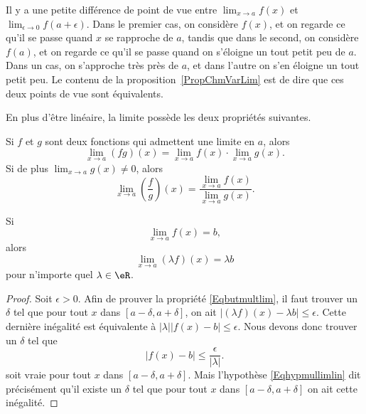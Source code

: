 Il y a une petite différence de point de vue entre \( \lim_{x\to a}f(x)\) et \( \lim_{\epsilon\to 0}f(a+\epsilon)\). Dans le premier cas, on considère \( f(x)\), et on regarde ce qu'il se passe quand \( x\) se rapproche de \( a\), tandis que dans le second, on considère \( f(a)\), et on regarde ce qu'il se passe quand on s'éloigne un tout petit peu de \( a\). Dans un cas, on s'approche très près de \( a\), et dans l'autre on s'en éloigne un tout petit peu. Le contenu de la proposition~\ref{PropChmVarLim} est de dire que ces deux points de vue sont équivalents.


En plus d'être linéaire, la limite possède les deux propriétés suivantes.
\begin{proposition}     \label{PROPooDQFIooMMwxxJ}
	Si \( f\) et \( g\) sont deux fonctions qui admettent une limite en \( a\), alors
	\begin{equation}
		\lim_{x\to a} (fg)(x)=\lim_{x\to a} f(x)\cdot\lim_{x\to a} g(x).
	\end{equation}
	Si de plus \( \lim_{x\to a} g(x)\neq 0\), alors
	\begin{equation}
		\lim_{x\to a} \left(\frac{ f }{ g }\right)(x)=\frac{ \lim_{x\to a} f(x) }{ \lim_{x\to a} g(x) }.
	\end{equation}
\end{proposition}

\begin{theorem}     \label{ThoLimLinMul}
	Si
	\begin{equation} \label{Eqhypmullimlin}
		\lim_{x\to a}f(x)=b,
	\end{equation}
	alors
	\begin{equation} \label{Eqbutmultlim}
		\lim_{x\to a}(\lambda f)(x)=\lambda b
	\end{equation}
	pour n'importe quel \( \lambda\in\eR\).
\end{theorem}

\begin{proof}
	Soit \( \epsilon>0\). Afin de prouver la propriété \eqref{Eqbutmultlim}, il faut trouver un \( \delta\) tel que pour tout \( x\) dans \( [a-\delta,a+\delta]\), on ait \( | (\lambda f)(x)- \lambda b |\leq\epsilon\). Cette dernière inégalité est équivalente à \( |\lambda|| f(x)-b |\leq\epsilon\). Nous devons donc trouver un \( \delta\) tel que
	\begin{equation}
		| f(x)-b |\leq\frac{ \epsilon }{ | \lambda | }.
	\end{equation}
	soit vraie pour tout \( x\) dans \( [a-\delta,a+\delta]\). Mais l'hypothèse \eqref{Eqhypmullimlin} dit précisément qu'il existe un \( \delta\) tel que pour tout \( x\) dans \( [a-\delta,a+\delta]\) on ait cette inégalité.
\end{proof}

